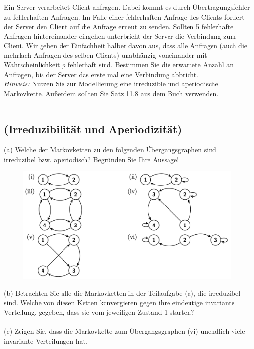 \documentclass[a4paper]{article}
\begin{document}
\subsection{}
Ein Server verarbeitet Client anfragen. Dabei kommt es durch Übertragungsfehler zu fehlerhaften Anfragen. Im Falle einer fehlerhaften Anfrage des Clients fordert der Server den Client auf die Anfrage erneut zu senden. Sollten 5 fehlerhafte Anfragen hintereinander eingehen unterbricht der Server die Verbindung zum Client. Wir gehen der Einfachheit halber davon aus, dass alle Anfragen (auch die mehrfach Anfragen des selben Clients) unabhängig voneinander mit Wahrscheinlichkeit $p$ fehlerhaft sind. Bestimmen Sie die erwartete Anzahl an Anfragen, bis
der Server das erste mal eine Verbindung abbricht.\\
\textit{Hinweis:} Nutzen Sie zur Modellierung eine irreduzible und aperiodische Markovkette. Außerdem sollten Sie Satz 11.8 aus dem Buch verwenden.\\\\
\subsection{(Irreduzibilität und Aperiodizität)}
(a) Welche der Markovketten zu den folgenden Übergangsgraphen sind irreduzibel bzw. aperiodisch? Begründen Sie Ihre Aussage!\\
\begin{figure}[H]
    \centering
    \includegraphics[width=0.8\linewidth]{markov.png}
\end{figure}
\noindent (b) Betrachten Sie alle die Markovketten in der Teilaufgabe (a), die irreduzibel sind. Welche von diesen Ketten konvergieren gegen ihre eindeutige invariante Verteilung, gegeben, dass sie vom jeweiligen Zustand 1 starten?\\\\
(c) Zeigen Sie, dass die Markovkette zum Übergangsgraphen (vi) unendlich viele invariante Verteilungen hat.\\\\
\end{document}

